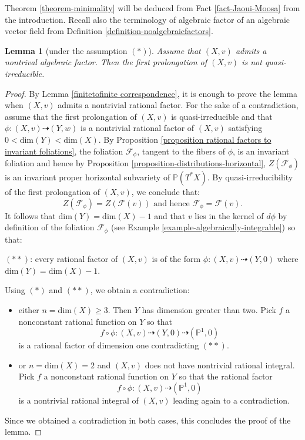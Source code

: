 \documentclass[12pt]{amsart}
\renewcommand{\P}{\mathbb{P}}
\theoremstyle{definition}
\theoremstyle{plain}
\newtheorem{lemma}[definition]{Lemma}
\theoremstyle{exampstyle}
\theoremstyle{exampstyle}\newtheorem{thmxbis}{Theorem}
\numberwithin{equation}{section}
\theoremstyle{remark}
\begin{document}
Theorem \ref{theorem-minimality} will be deduced from Fact \ref{fact-Jaoui-Moosa} from the introduction. Recall also the terminology of algebraic factor of an algebraic vector field from Definition \ref{definition-noalgebraicfactors}. 

 
\begin{lemma}[under the assumption $(\ast)$]\label{lemma-rational factors}
Assume that $(X,v)$ admits a nontrival algebraic factor. Then the first prolongation of $(X,v)$ is not quasi-irreducible. 
\end{lemma} 

\begin{proof} 
By Lemma \ref{finitetofinite correspondence}, it is enough to prove the lemma when $(X,v)$ admits a nontrivial rational factor. For the sake of a contradiction, assume that the first prolongation of $(X,v)$ is quasi-irreducible and that $\phi: (X,v) \dashrightarrow (Y,w)$ is a nontrivial rational factor of $(X,v)$ satisfying  $0 < \mathrm{dim}(Y) < \mathrm{dim}(X)$. By Proposition \ref{proposition rational factors to invariant foliations}, the foliation $\mathcal F_\phi$, tangent to the fibers of $\phi$, is an invariant foliation and hence by Proposition \ref{proposition-distributions-horizontal}, 
$ Z(\mathcal F_\phi)$
is an invariant proper horizontal subvariety of $\P(T^\ast X)$. By quasi-irreducibility of the first prolongation of $(X,v)$, we conclude that:  
$$ Z(\mathcal F_\phi) = Z(\mathcal F(v)) \text{ and hence } \mathcal F_\phi = \mathcal F(v).$$ 
It follows that $\mathrm{dim}(Y) = \mathrm{dim}(X) - 1$ and that $v$ lies in the kernel of $d\phi$ by definition of the foliation $\mathcal F_\phi$ (see Example \ref{example-algebraically-integrable}) so that:
\begin{center}
$(\ast \ast)$: every rational factor of $(X,v)$ is of the form
$\phi: (X,v) \dashrightarrow (Y,0)$
where $\mathrm{dim}(Y) = \mathrm{dim}(X) - 1$.
\end{center}

Using $(\ast)$ and $(\ast \ast)$, we obtain a contradiction:

\begin{itemize} 
\item either $n = \mathrm{dim}(X) \geq 3$. Then $Y$ has dimension greater than two. Pick $f$ a nonconstant rational function on $Y$ so that 
$$f \circ \phi: (X,v) \dashrightarrow (Y,0) \dashrightarrow (\mathbb{P}^1,0)$$
is a rational factor of dimension one contradicting $(\ast \ast)$. 

\item or $n = \mathrm{dim}(X) = 2$ and $(X,v)$ does not have nontrivial rational integral. Pick $f$ a nonconstant rational function on $Y$ so that the rational factor 
$$ f\circ \phi: (X,v) \dashrightarrow (\mathbb{P}^1,0)$$
is a nontrivial rational integral of $(X,v)$ leading again to a contradiction.
\end{itemize} 
Since we obtained a contradiction in both cases, this concludes the proof of the lemma.
\end{proof} 
\end{document}
